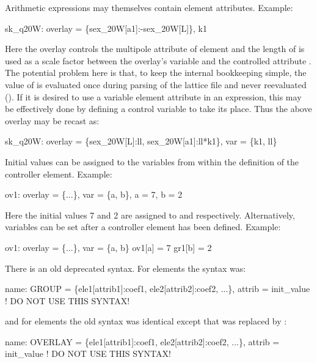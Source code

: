 Arithmetic expressions may themselves contain element attributes.
Example:
\begin{example}
  sk_q20W: overlay = \{sex_20W[a1]:-sex_20W[L]\}, k1
\end{example}
Here the  overlay controls the  multipole attribute of element  and
the length of  is used as a scale factor between the overlay's variable  and the
controlled attribute . The potential problem here is that, to keep the internal bookkeeping
simple, the value of  is evaluated once during parsing of the lattice file and never
reevaluated ().  If it is desired to use a variable element attribute in an
expression, this may be effectively done by defining a control variable to take its place. Thus the
above overlay may be recast as:
\begin{example}
  sk_q20W: overlay = \{sex_20W[L]:ll, sex_20W[a1]:ll*k1\}, var = \{k1, ll\}
\end{example}

Initial values can be assigned to the variables from within the
definition of the controller element. Example:
\begin{example}
  ov1: overlay = \{...\}, var = \{a, b\}, a = 7, b = 2
\end{example}
Here the initial values 7 and 2 are assigned to  and  respectively.  Alternatively,
variables can be set after a controller element has been defined.  Example:
\begin{example}
  ov1: overlay = \{...\}, var = \{a, b\}
  ov1[a] = 7
  gr1[b] = 2
\end{example}

There is an old deprecated syntax. For  elements the syntax was:
\begin{example}
  name: GROUP = \{ele1[attrib1]:coef1, ele2[attrib2]:coef2, ...\}, 
                       attrib = init_value  ! DO NOT USE THIS SYNTAX!
\end{example}
and for  elements the old syntax was identical except
that  was replaced by :
\begin{example}
  name: OVERLAY = \{ele1[attrib1]:coef1, ele2[attrib2]:coef2, ...\}, 
                       attrib = init_value  ! DO NOT USE THIS SYNTAX!
\end{example}


